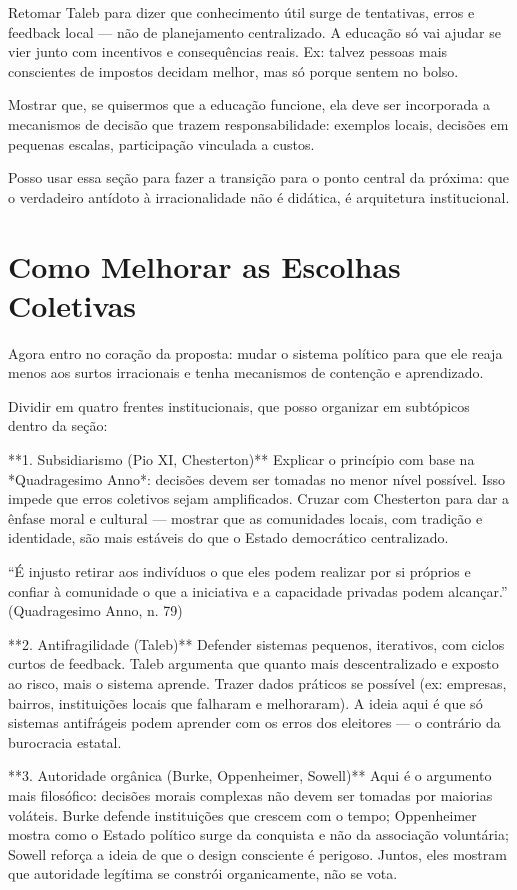 Retomar Taleb para dizer que conhecimento útil surge de tentativas, erros e feedback local — não de planejamento centralizado. A educação só vai ajudar se vier junto com incentivos e consequências reais. Ex: talvez pessoas mais conscientes de impostos decidam melhor, mas só porque sentem no bolso.

Mostrar que, se quisermos que a educação funcione, ela deve ser incorporada a mecanismos de decisão que trazem responsabilidade: exemplos locais, decisões em pequenas escalas, participação vinculada a custos.

Posso usar essa seção para fazer a transição para o ponto central da próxima: que o verdadeiro antídoto à irracionalidade não é didática, é arquitetura institucional.

\section{Como Melhorar as Escolhas Coletivas} %

Agora entro no coração da proposta: mudar o sistema político para que ele reaja menos aos surtos irracionais e tenha mecanismos de contenção e aprendizado.

Dividir em quatro frentes institucionais, que posso organizar em subtópicos dentro da seção:

**1. Subsidiarismo (Pio XI, Chesterton)**  
Explicar o princípio com base na *Quadragesimo Anno*: decisões devem ser tomadas no menor nível possível. Isso impede que erros coletivos sejam amplificados. Cruzar com Chesterton para dar a ênfase moral e cultural — mostrar que as comunidades locais, com tradição e identidade, são mais estáveis do que o Estado democrático centralizado.

“É injusto retirar aos indivíduos o que eles podem realizar por si próprios e confiar à comunidade o que a iniciativa e a capacidade privadas podem alcançar.” (Quadragesimo Anno, n. 79)

**2. Antifragilidade (Taleb)**  
Defender sistemas pequenos, iterativos, com ciclos curtos de feedback. Taleb argumenta que quanto mais descentralizado e exposto ao risco, mais o sistema aprende. Trazer dados práticos se possível (ex: empresas, bairros, instituições locais que falharam e melhoraram). A ideia aqui é que só sistemas antifrágeis podem aprender com os erros dos eleitores — o contrário da burocracia estatal.

**3. Autoridade orgânica (Burke, Oppenheimer, Sowell)**  
Aqui é o argumento mais filosófico: decisões morais complexas não devem ser tomadas por maiorias voláteis. Burke defende instituições que crescem com o tempo; Oppenheimer mostra como o Estado político surge da conquista e não da associação voluntária; Sowell reforça a ideia de que o design consciente é perigoso. Juntos, eles mostram que autoridade legítima se constrói organicamente, não se vota.

